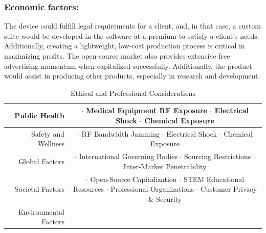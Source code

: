 \documentclass[12pt]{article}
\begin{document}
\subsubsection{Economic factors:}
The device could fulfill legal requirements for a client, and, in that case, a custom suite would be developed in the software at a premium to satisfy a client's needs.  Additionally, creating a lightweight, low-cost production process is critical in maximizing profits.  The open-source market also provides extensive free advertising momentum when capitalized successfully.  Additionally, the product would assist in producing other products, especially in research and development. \\
\begin{table}[h!]
\centering
\caption{Ethical and Professional Considerations}
\begin{tabular} {| r | c | }
\hline
\parbox{0.3\linewidth}{\raggedleft Public Health} &   \parbox{0.65\linewidth}{\hfill \\
$\cdot$ Medical Equipment RF Exposure \\ $\cdot$ Electrical Shock \\ $\cdot$ Chemical Exposure}\\
\hline
\parbox{0.3\linewidth}{\raggedleft Safety and Wellness} &   \parbox{0.65\linewidth}{\hfill \\
$\cdot$ RF Bandwidth Jamming \\ $\cdot$ Electrical Shock \\ $\cdot$ Chemical Exposure}\\
\hline
\parbox{0.3\linewidth}{\raggedleft Global Factors} &   \parbox{0.65\linewidth}{\hfill \\
$\cdot$ International Governing Bodies \\ $\cdot$ Sourcing Restrictions \\ $\cdot$ Inter-Market Penetrability}\\
\hline
\parbox{0.3\linewidth}{\raggedleft Societal Factors} &   \parbox{0.65\linewidth}{\hfill \\
$\cdot$ Open-Source Capitalization\\ $\cdot$ STEM Educational Resources \\ $\cdot$ Professional Organizations \\ $\cdot$ Customer Privacy \& Security}\\
\hline
\parbox{0.3\linewidth}{\raggedleft Environmental Factors} &   \parbox{0.65\linewidth}{\hfill \\
}
\end{tabular}
\end{table}
\end{document}
